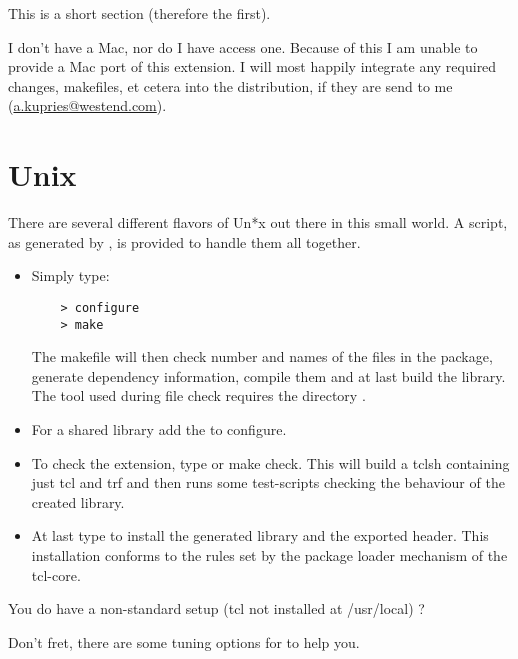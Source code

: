 	This is a short section (therefore the first).

	I don't have a Mac, nor do I have access one. Because
	of this I am unable to provide a Mac port of this
	extension.  I will most happily integrate any required
	changes, makefiles, et cetera into the distribution,
	if they are send to me (\url {a.kupries@westend.com}).


\section {Unix}

There are several different flavors of Un*x out there in this small
world. A  script, as generated by , is provided to handle them all together.

\begin {itemize}
\item	Simply type:

\begin{verbatim}
	> configure
	> make
\end{verbatim}

The makefile will then check number and names of the files in the
package, generate dependency information, compile them and at last
build the library.  The tool  used during file
check requires the directory .


\item	For a shared library add the  to \cmd
	{configure}. 


\item	To check the extension, type  or \cmd
	{make check}. This will build a tclsh containing just tcl and
	trf and then runs some test-scripts checking the behaviour of
	the created library. 

\item	At last type  to install the generated
	library and the exported header. This installation conforms to
	the rules set by the package loader mechanism of the tcl-core. 
\end {itemize}

You do have a non-standard setup (tcl not installed at \file
{/usr/local}) ?

Don't fret, there are some tuning options for  to help
you. 

